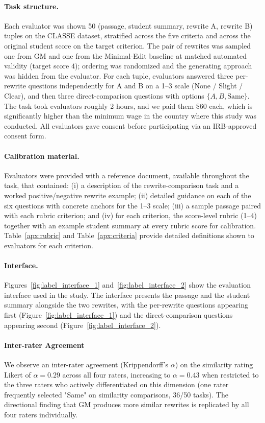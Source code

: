 \documentclass[11pt]{article}
\begin{document}
\paragraph{Task structure.} Each evaluator was shown 50 (passage, student summary, rewrite A, rewrite B) tuples on the CLASSE dataset, stratified across the five criteria and across the original student score on the target criterion. The pair of rewrites was sampled one from GM and one from the Minimal-Edit baseline at matched automated validity (target score $4$); ordering was randomized and the generating approach was hidden from the evaluator. For each tuple, evaluators answered three per-rewrite questions independently for A and B on a 1--3 scale (None / Slight / Clear), and then three direct-comparison questions with options $\{A, B, \text{Same}\}$. The task took evaluators roughly 2 hours, and we paid them \$60 each, which is significantly higher than the minimum wage in the country where this study was conducted. All evaluators gave consent before participating via an IRB-approved consent form.

\paragraph{Calibration material.} Evaluators were provided with a reference document, available throughout the task, that contained: (i) a description of the rewrite-comparison task and a worked positive/negative rewrite example; (ii) detailed guidance on each of the six questions with concrete anchors for the 1--3 scale; (iii) a sample passage paired with each rubric criterion; and (iv) for each criterion, the score-level rubric (1--4) together with an example student summary at every rubric score for calibration. Table~\ref{apx:rubric} and Table~\ref{apx:criteria} provide detailed definitions shown to evaluators for each criterion.

\paragraph{Interface.} Figures~\ref{fig:label_interface_1} and~\ref{fig:label_interface_2} show the evaluation interface used in the study. The interface presents the passage and the student summary alongside the two rewrites, with the per-rewrite questions appearing first (Figure~\ref{fig:label_interface_1}) and the direct-comparison questions appearing second (Figure~\ref{fig:label_interface_2}).

\paragraph{Inter-rater Agreement} We observe an inter-rater agreement (Krippendorff's $\alpha$) on the similarity rating Likert of $\alpha=0.29$ across all four raters, increasing to $\alpha=0.43$ when restricted to the three raters who actively differentiated on this dimension (one rater frequently selected "Same" on similarity comparisons, 36/50 tasks). The directional finding that GM produces more similar rewrites is replicated by all four raters individually.
\end{document}
